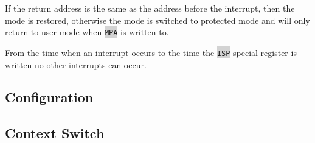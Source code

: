 \documentclass{article}
\newcommand{\labcode}[1]{\colorbox{lightgray}{\lstinline[language=lab]{#1}}}
\begin{document}
If the return address is the same as the address before the interrupt, then the
mode is restored, otherwise the mode is switched to protected mode and will only
return to user mode when \labcode{MPA} is written to.

From the time when an interrupt occurs to the time the \labcode{ISP} special
register is written no other interrupts can occur.

\subsection{Configuration}


\subsection{Context Switch}

\end{document}
